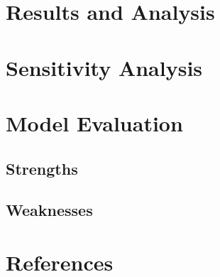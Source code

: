 \documentclass[12pt,a4paper]{article}
\begin{document}
\section{Results and Analysis}

\section{Sensitivity Analysis}

\section{Model Evaluation}

\subsection{Strengths}

\subsection{Weaknesses}

\section*{References}
\end{document}
